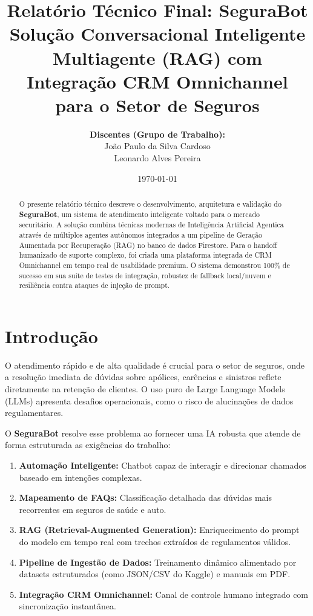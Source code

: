 \documentclass[12pt,a4paper]{article}
\title{
    \textbf{Relatório Técnico Final: SeguraBot}\\
    \large Solução Conversacional Inteligente Multiagente (RAG) com Integração CRM Omnichannel para o Setor de Seguros
}
\author{
    \textbf{Discentes (Grupo de Trabalho):}\\
    João Paulo da Silva Cardoso\\
    Leonardo Alves Pereira
}
\date{\today}
\begin{document}
\maketitle

\thispagestyle{empty}
\newpage
{}

\begin{abstract}
O presente relatório técnico descreve o desenvolvimento, arquitetura e validação do \textbf{SeguraBot}, um sistema de atendimento inteligente voltado para o mercado securitário. A solução combina técnicas modernas de Inteligência Artificial Agentica através de múltiplos agentes autônomos integrados a um pipeline de Geração Aumentada por Recuperação (RAG) no banco de dados Firestore. Para o handoff humanizado de suporte complexo, foi criada uma plataforma integrada de CRM Omnichannel em tempo real de usabilidade premium. O sistema demonstrou 100\% de sucesso em sua suíte de testes de integração, robustez de fallback local/nuvem e resiliência contra ataques de injeção de prompt.
\end{abstract}

\newpage

\section{Introdução}
O atendimento rápido e de alta qualidade é crucial para o setor de seguros, onde a resolução imediata de dúvidas sobre apólices, carências e sinistros reflete diretamente na retenção de clientes. O uso puro de Large Language Models (LLMs) apresenta desafios operacionais, como o risco de alucinações de dados regulamentares. 

O \textbf{SeguraBot} resolve esse problema ao fornecer uma IA robusta que atende de forma estruturada as exigências do trabalho:
\begin{enumerate}
    \item \textbf{Automação Inteligente:} Chatbot capaz de interagir e direcionar chamados baseado em intenções complexas.
    \item \textbf{Mapeamento de FAQs:} Classificação detalhada das dúvidas mais recorrentes em seguros de saúde e auto.
    \item \textbf{RAG (Retrieval-Augmented Generation):} Enriquecimento do prompt do modelo em tempo real com trechos extraídos de regulamentos válidos.
    \item \textbf{Pipeline de Ingestão de Dados:} Treinamento dinâmico alimentado por datasets estruturados (como JSON/CSV do Kaggle) e manuais em PDF.
    \item \textbf{Integração CRM Omnichannel:} Canal de controle humano integrado com sincronização instantânea.
\end{enumerate}
\end{document}
